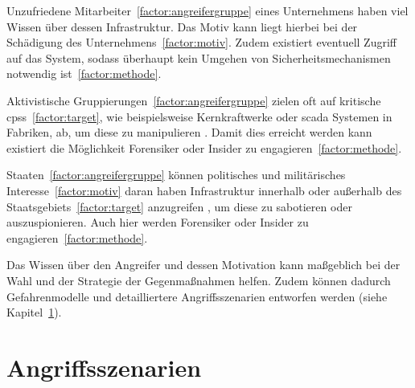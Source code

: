 \documentclass[final,bibliography=totocnumbered]{include/sikseminar}
\newcommand{\cps}{\glspl{cps}\xspace}
\begin{document}
Unzufriedene Mitarbeiter~\ref{factor:angreifergruppe} eines Unternehmens haben viel Wissen über dessen Infrastruktur.
Das Motiv kann liegt hierbei bei der Schädigung des Unternehmens~\ref{factor:motiv}.
Zudem existiert eventuell Zugriff auf das System, sodass überhaupt kein Umgehen von Sicherheitsmechanismen notwendig ist~\ref{factor:methode}.~\cite{CAS+09,WYX+10}

Aktivistische Gruppierungen~\ref{factor:angreifergruppe} zielen oft auf kritische \cps~\ref{factor:target}, wie beispielsweise Kernkraftwerke oder \gls{scada} Systemen in Fabriken, ab, um diese zu manipulieren \cite{CAS+09,HLL+17}. 
Damit dies erreicht werden kann existiert die Möglichkeit Forensiker oder Insider zu engagieren~\ref{factor:methode}.~\cite{WYX+10}

Staaten~\ref{factor:angreifergruppe} können politisches und militärisches Interesse~\ref{factor:motiv} daran haben Infrastruktur innerhalb oder außerhalb des Staatsgebiets~\ref{factor:target} anzugreifen \cite{CAS+09}, um diese zu sabotieren oder auszuspionieren.
Auch hier werden Forensiker oder Insider zu engagieren~\ref{factor:methode}.

Das Wissen über den Angreifer und dessen Motivation kann maßgeblich bei der Wahl und der Strategie der Gegenmaßnahmen helfen.
Zudem können dadurch Gefahrenmodelle und detailliertere Angriffsszenarien entworfen werden (siehe Kapitel~\ref{sec:angriffszenarien}).


\section{Angriffsszenarien}\label{sec:angriffszenarien}
\end{document}
